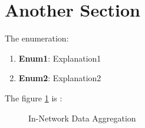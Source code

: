 \section{Another Section}


The enumeration:\\[1ex]
\begin{enumerate}
\item \textbf{Enum1}: Explanation1
\item \textbf{Enum2}: Explanation2
\end{enumerate}

The figure \ref{fig1} is \cite{RW1} : \\[1ex]

\begin{figure}[t]
\centering
{}
\qquad
{}
\caption{In-Network Data Aggregation}
\label{fig1}
\end{figure}

